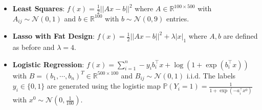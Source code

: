 \begin{itemize}
\item \textbf{Least Squares}: $f(x) = \frac{1}{2} || Ax - b||^2$ where $A \in \mathbb{R}^{100 \times 500}$ with $A_{ij} \sim \mathcal{N}(0,1)$ and $b \in \mathbb{R}^{100}$ with $b \sim \mathcal{N}(0,9)$ entries.
\item \textbf{Lasso with Fat Design}: $f(x) = \frac{1}{2} ||Ax - b||^2 + \lambda |x|_1$ where $A, b$ are defined as before and $\lambda = 4$.
\item \textbf{Logistic Regression}: $f(x) = \sum_{i=1}^n -y_i b_i^\top x + \log(1+ \exp(b_i^\top x))$ with $B = (b_1, \cdots, b_n)^T \in \mathbb{R}^{500 \times 100}$ and $B_{ij} \sim \mathcal{N}(0,1)$ i.i.d. The labels $y_i \in \{0,1\}$ are generated using the logistic map $\mathbb{P}(Y_i=1) = \frac{1}{1+\exp(-a_i^\top x^0)}$ with $x^0 \sim \mathcal{N}(0,\frac{1}{100})$.
\end{itemize}

